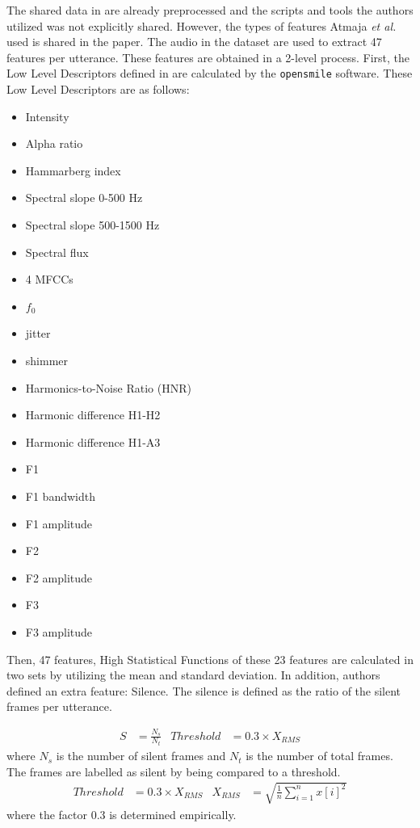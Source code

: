 \documentclass[a4paper,11pt]{article}
\begin{document}
The shared data in \cite{atmaja2020deep} are already preprocessed and the scripts and tools the authors utilized was not explicitly shared. However, the types of features Atmaja \textit{et al.} used is shared in the paper.  
The audio in the dataset are used to extract 47 features per utterance.
These features are obtained in a 2-level process. First, the Low Level Descriptors defined in \cite{eyben2010opensmile} are calculated by the \texttt{opensmile} software. These Low Level Descriptors are as follows: 
\begin{multicols}{2}
\begin{itemize}
    \item Intensity
    \item Alpha ratio
    \item Hammarberg index
    \item Spectral slope 0-500 Hz
    \item Spectral slope 500-1500 Hz
    \item Spectral flux
    \item 4 MFCCs
    \item $f_0$
    \item jitter
    \item shimmer
    \item Harmonics-to-Noise Ratio (HNR)
    \item Harmonic difference H1-H2
    \item Harmonic difference H1-A3
    \item F1
    \item F1 bandwidth
    \item F1 amplitude
    \item F2
    \item F2 amplitude
    \item F3 
    \item F3 amplitude
\end{itemize}
\end{multicols}

Then, 47 features, High Statistical Functions of these 23 features are calculated in two sets by utilizing the mean and standard deviation. In addition, authors defined an extra feature: Silence. The silence is defined as the ratio of the silent frames per utterance. 

\begin{align}
    S &= \frac{N_s}{N_t} & Threshold &= 0.3 \times X_{RMS}
\end{align}
where $N_s$ is the number of silent frames and $N_t$ is the number of total frames.
The frames are labelled as silent by being compared to a threshold. 
\begin{align}
    Threshold &= 0.3 \times X_{RMS} & X_{RMS} &= \sqrt{\frac{1}{n}\sum_{i=1}^n{x[i]}^2}
\end{align}
where the factor 0.3 is determined empirically.
\end{document}
